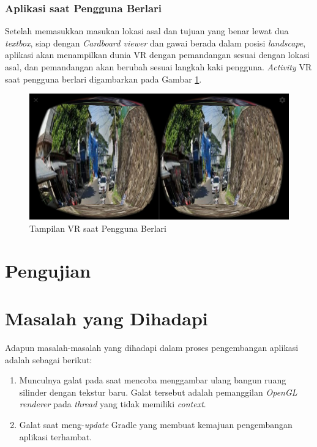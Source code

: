 \subsubsection{Aplikasi saat Pengguna Berlari}
Setelah memasukkan masukan lokasi asal dan tujuan yang benar lewat dua \textit{textbox}, siap dengan \textit{Cardboard viewer} dan gawai berada dalam posisi \textit{landscape},  aplikasi akan menampilkan dunia VR dengan pemandangan sesuai dengan lokasi asal, dan pemandangan akan berubah sesuai langkah kaki pengguna. \textit{Activity} VR saat pengguna berlari digambarkan pada Gambar \ref{fig:vr-page}.

\begin{figure}
\centering
\includegraphics[width=\textwidth]{Gambar/vr-page.png}
    \caption{Tampilan VR saat Pengguna Berlari}
    \label{fig:vr-page}
\end{figure}


\section{Pengujian}



\section{Masalah yang Dihadapi}
Adapun masalah-masalah yang dihadapi dalam proses pengembangan aplikasi adalah sebagai berikut:

\begin{enumerate}
	\item Munculnya galat pada saat mencoba menggambar ulang bangun ruang silinder dengan tekstur baru. Galat tersebut adalah pemanggilan \textit{OpenGL renderer} pada \textit{thread} yang tidak memiliki \textit{context}. 
	
	\item Galat saat meng-\textit{update} Gradle yang membuat kemajuan pengembangan aplikasi terhambat.
\end{enumerate}

